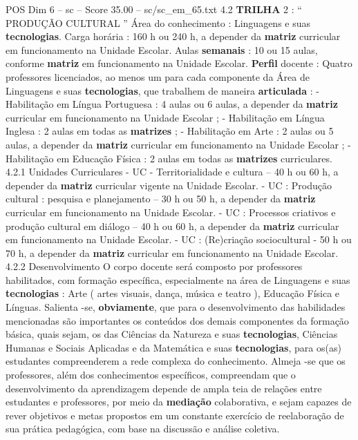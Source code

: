 \begin{textsample}{POS Dim 6 – sc – Score 35.00 – sc/sc\_em\_65.txt}  \label{ex:f6_pos_002}
4.2 \textbf{TRILHA} 2 : “ PRODUÇÃO CULTURAL ” Área do conhecimento : Linguagens e suas \textbf{tecnologias}.
Carga horária : 160 h ou 240 h, a depender da \textbf{matriz} curricular em funcionamento na Unidade Escolar.
Aulas \textbf{semanais} : 10 ou 15 aulas, conforme \textbf{matriz} em funcionamento na Unidade Escolar. \textbf{Perfil} docente : Quatro professores licenciados, ao menos um para cada componente da Área de Linguagens e suas \textbf{tecnologias}, que trabalhem de maneira \textbf{articulada} : - Habilitação em Língua Portuguesa : 4 aulas ou 6 aulas, a depender da \textbf{matriz} curricular em funcionamento na Unidade Escolar ; - Habilitação em Língua Inglesa : 2 aulas em todas as \textbf{matrizes} ; - Habilitação em Arte : 2 aulas ou 5 aulas, a depender da \textbf{matriz} curricular em funcionamento na Unidade Escolar ; - Habilitação em Educação Física : 2 aulas em todas as \textbf{matrizes} curriculares. 4.2.1 Unidades Curriculares - UC - Territorialidade e cultura – 40 h ou 60 h, a depender da \textbf{matriz} curricular vigente na Unidade Escolar. - UC : Produção cultural : pesquisa e planejamento – 30 h ou 50 h, a depender da \textbf{matriz} curricular em funcionamento na Unidade Escolar. - UC : Processos criativos e produção cultural em diálogo – 40 h ou 60 h, a depender da \textbf{matriz} curricular em funcionamento na Unidade Escolar. - UC : (Re)criação sociocultural - 50 h ou 70 h, a depender da \textbf{matriz} curricular em funcionamento na Unidade Escolar. 4.2.2 Desenvolvimento O corpo docente será composto por professores habilitados, com formação específica, especialmente na área de Linguagens e suas \textbf{tecnologias} : Arte ( artes visuais, dança, música e teatro ), Educação Física e Línguas.
Salienta -se, \textbf{obviamente}, que para o desenvolvimento das habilidades mencionadas são importantes os conteúdos dos demais componentes da formação básica, quais sejam, os das Ciências da Natureza e suas \textbf{tecnologias}, Ciências Humanas e Sociais Aplicadas e da Matemática e suas \textbf{tecnologias}, para os(as) estudantes compreenderem a rede complexa do conhecimento.
Almeja -se que os professores, além dos conhecimentos específicos, compreendam que o desenvolvimento da aprendizagem depende de ampla teia de relações entre estudantes e professores, por meio da \textbf{mediação} colaborativa, e sejam capazes de rever objetivos e metas propostos em um constante exercício de reelaboração de sua prática pedagógica, com base na discussão e análise coletiva.

\end{textsample}
